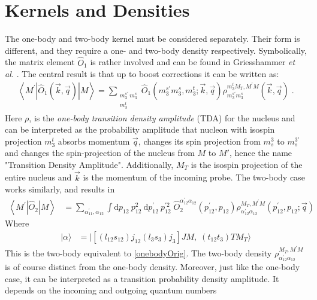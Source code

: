 \documentclass[a4paper,11pt]{article}
\newcommand{\etal}{\textit{et al.}}
\newcommand\bv[1]{\vec{#1}}
\begin{document}
\section{Kernels and Densities}
The one-body and two-body kernel must be considered separately.
Their form is different, and they require a one- and
two-body density respectively.
Symbolically, the matrix element $\hat{O}_1$ is rather involved and can be found in Griesshammer \etal 
\cite{hammer2020, hammer4He}.
The central result is that up to boost corrections it can
be written as:
\begin{align}
  \left\langle M^{\prime}\left|\hat{O}_{1}(\bv{k}, \bv{q})\right|
  M\right\rangle=\sum_{\substack{m_{3}^{s \prime}\,
  m_{3}^{s}\\m_3^t}}\hat{O}_{1}\left(m_{3}^{s \prime} m_{3}^{s},
  m_{3}^{t} ;  \bv{k}, \bv{q}\right) \rho_{m_{3}^{s \prime}
  m_{3}^{s}}^{m_3^{t} M_{T}, M^{\prime} M}(\bv{k}, \bv{q})\label{onebodyOrig}\;.
\end{align}
Here $\rho$, is the \textit{one-body transition density amplitude} (TDA)
for the nucleus and can be
interpreted as the probability amplitude that nucleon with isospin projection $m_3^t$ absorbs
momentum $\bv{q}$, changes its spin projection from $m_s^3$ to
$m_s^{3'}$ and changes the spin-projection of the nucleus from $M$ to
$M'$, hence the name "Transition Density Amplitude".
Additionally, $M_T$ is the isospin projection of the entire nucleus and $\vec{k}$ is the momentum of the incoming probe.
The two-body case works similarly, and results in
\begin{align}
  \left\langle M^{\prime}\left|\hat{O}_{2}\right| M\right\rangle &=
  \sum_{\alpha_{11}^{\prime}, \alpha_{12}} \int \mathrm{d} p_{12}\:
  p_{12}^{2} \mathrm{~d} p_{12}^{\prime}\: p_{12}^{\prime 2}\;
  \hat{O}_{2}^{\alpha_{12}^{\prime} \alpha_{12}}\left(p_{12}^{\prime},
  p_{12}\right) \rho_{\alpha_{12}^{\prime} \alpha_{12}}^{M_{T},
  M^{\prime} M}\left(p_{12}^{\prime}, p_{12} ; \bv{q}\right)\label{twobody}\;
\end{align}
Where
\begin{align}
   | \alpha \rangle & =|\left[(l_{12}s_{12})j_{12}(l_3 s_3)j_3\right] JM,\;(t_{12}t_3)TM_T\rangle
\end{align}
This is the two-body equivalent to \eqref{onebodyOrig}.
The two-body density $\rho_{\alpha_{12}^{\prime}
\alpha_{12}}^{M_{T}, M^{\prime} M}$ is of course distinct
from the one-body density.
Moreover, just like the one-body case, it can be interpreted as a
transition probability density amplitude.
It depends on the incoming and outgoing quantum numbers
\end{document}

